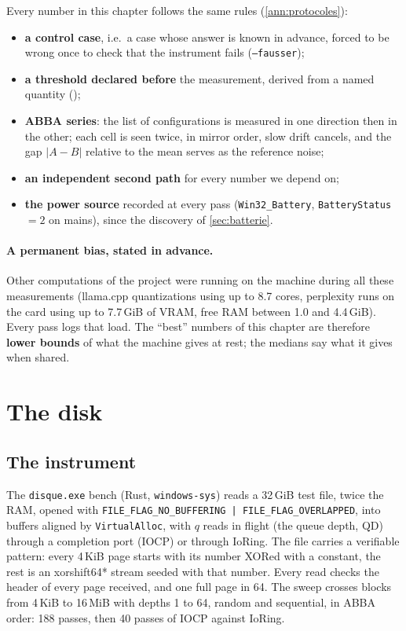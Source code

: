 Every number in this chapter follows the same rules (\cref{ann:protocoles}):
\begin{itemize}
\item \textbf{a control case}, i.e.\ a case whose answer is known in advance, forced to be wrong once to check that the instrument fails (\texttt{--fausser});
\item \textbf{a threshold declared before} the measurement, derived from a named quantity ();
\item \textbf{ABBA series}: the list of configurations is measured in one direction then in the other; each cell is seen twice, in mirror order, slow drift cancels, and the gap $|A-B|$ relative to the mean serves as the reference noise;
\item \textbf{an independent second path} for every number we depend on;
\item \textbf{the power source} recorded at every pass (\texttt{Win32\_Battery}, \texttt{BatteryStatus} $=2$ on mains), since the discovery of \cref{sec:batterie}.
\end{itemize}

\paragraph{A permanent bias, stated in advance.} Other computations of the project were running on the machine during all these measurements (llama.cpp quantizations using up to 8.7 cores, perplexity runs on the card using up to 7.7\,GiB of VRAM, free RAM between 1.0 and 4.4\,GiB). Every pass logs that load. The \enquote{best} numbers of this chapter are therefore \textbf{lower bounds} of what the machine gives at rest; the medians say what it gives when shared.

\section{The disk}\label{sec:disque}

\subsection{The instrument}

The \texttt{disque.exe} bench (Rust, \texttt{windows-sys}) reads a 32\,GiB test file, twice the RAM, opened with \texttt{FILE\_FLAG\_NO\_BUFFERING | FILE\_FLAG\_OVERLAPPED}, into buffers aligned by \texttt{VirtualAlloc}, with $q$ reads in flight (the queue depth, QD) through a completion port (IOCP) or through IoRing. The file carries a verifiable pattern: every 4\,KiB page starts with its number XORed with a constant, the rest is an xorshift64* stream seeded with that number. Every read checks the header of every page received, and one full page in 64. The sweep crosses blocks from 4\,KiB to 16\,MiB with depths 1 to 64, random and sequential, in ABBA order: 188 passes, then 40 passes of IOCP against IoRing.

